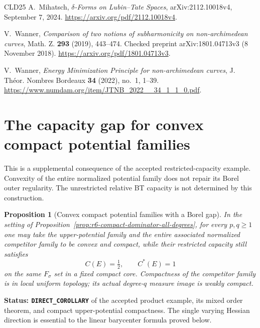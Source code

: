 \documentclass[11pt,a4paper]{article}
\numberwithin{equation}{section}
\newtheorem{proposition}[theorem]{Proposition}
\theoremstyle{definition}
\theoremstyle{remark}
\begin{document}
\begin{thebibliography}{CLD25}
A.~Mihatsch, \emph{$\delta$-Forms on Lubin--Tate Spaces},
arXiv:2112.10018v4, September 7, 2024.
\url{https://arxiv.org/pdf/2112.10018v4}.

V.~Wanner,
\emph{Comparison of two notions of subharmonicity on non-archimedean
curves}, Math. Z. \textbf{293} (2019), 443--474.
Checked preprint arXiv:1801.04713v3 (8 November 2018).
\url{https://arxiv.org/pdf/1801.04713v3}.

V.~Wanner,
\emph{Energy Minimization Principle for non-archimedean curves},
J. Th\'eor. Nombres Bordeaux \textbf{34} (2022), no.~1, 1--39.
\url{https://www.numdam.org/item/JTNB_2022__34_1_1_0.pdf}.
\end{thebibliography}


\clearpage
\appendix

\section{The capacity gap for convex compact potential families}
\label{sec:r6-convex-compact-capacity-gap}

This is a supplemental consequence of the accepted restricted-capacity
example. Convexity of the entire normalized potential family does not
repair its Borel outer regularity. The unrestricted relative BT capacity
is not determined by this construction.

\begin{proposition}[Convex compact potential families with a Borel gap]
\label{prop:r6-convex-compact-capacity-gap}
In the setting of Proposition~\ref{prop:r6-compact-dominator-all-degrees},
for every $p,q\ge1$ one may take the upper-potential family and the
entire associated normalized competitor family to be convex and compact,
while their restricted capacity still satisfies
\[
                         C(E)=\tfrac12,\qquad C^*(E)=1
\]
on the same $F_\sigma$ set in a fixed compact core. Compactness of the
competitor family is in local uniform topology; its actual degree-$q$
measure image is weakly compact.
\end{proposition}

\noindent\textbf{Status: \texttt{DIRECT\_COROLLARY}} of the
accepted product example, its mixed order theorem, and compact
upper-potential compactness. The single varying Hessian direction is
essential to the linear barycenter formula proved below.
\end{document}
